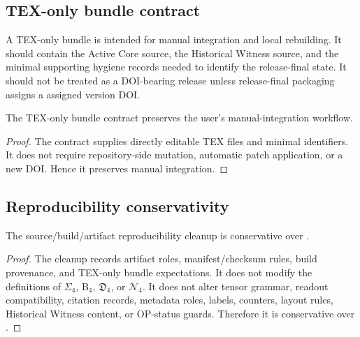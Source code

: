 \subsection{TEX-only bundle contract}
\label{subsec:v4013-tex-only-bundle-contract}

\begin{definition}
\label{def:v4013-tex-only-bundle-contract}
A TEX-only bundle is intended for manual integration and local rebuilding. It
should contain the Active Core source, the Historical Witness source, and the
minimal supporting hygiene records needed to identify the release-final state. It should
not be treated as a DOI-bearing release unless release-final packaging assigns
a assigned version DOI.
\end{definition}

\begin{lemma}
\label{lem:v4013-tex-only-bundle-preserves-manual-integration-workflow}
The TEX-only bundle contract preserves the user's manual-integration workflow.
\end{lemma}

\begin{proof}
The contract supplies directly editable TEX files and minimal identifiers. It
does not require repository-side mutation, automatic patch application, or a
new DOI. Hence it preserves manual integration.
\end{proof}

\subsection{Reproducibility conservativity}
\label{subsec:v4013-reproducibility-conservativity}

\begin{theorem}
\label{thm:v4013-source-build-artifact-hygiene-conservativity}
The  source/build/artifact reproducibility cleanup is conservative over
.
\end{theorem}

\begin{proof}
The cleanup records artifact roles, manifest/checksum rules, build provenance,
and TEX-only bundle expectations. It does not modify the definitions of
$\Sigma_4$, $\mathrm B_4$, $\mathfrak D_4$, or $\mathcal N_4$. It does not
alter tensor grammar, readout compatibility, citation records, metadata roles,
labels, counters, layout rules, Historical Witness content, or OP-status
guards. Therefore it is conservative over .
\end{proof}

